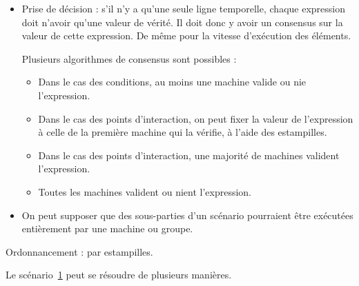 \documentclass{article}
\begin{document}
\begin{itemize}
	\item Prise de décision : s'il n'y a qu'une seule ligne temporelle, chaque expression doit n'avoir qu'une valeur de vérité. Il doit donc y avoir un consensus sur la valeur de cette expression. De même pour la vitesse d'exécution des éléments.
    
    Plusieurs algorithmes de consensus sont possibles : 
    \begin{itemize}
        \item Dans le cas des conditions, au moins une machine valide ou nie l'expression. 
        \item Dans le cas des points d'interaction, on peut fixer la valeur de l'expression à celle de la première machine qui la vérifie, à l'aide des estampilles. %
        \item Dans le cas des points d'interaction, une majorité de machines valident l'expression.
        \item Toutes les machines valident ou nient l'expression.
    \end{itemize}

	\item On peut supposer que des sous-parties d'un scénario pourraient être exécutées entièrement par une machine ou groupe.
\end{itemize}
Ordonnancement : par estampilles.

\begin{figure}[h]
    \centering
    \begin{tikzpicture}
    
    \end{tikzpicture}
    \label{scenar.trigger-1}
\end{figure}

Le scénario~\ref{scenar.trigger-1} peut se résoudre de plusieurs manières.
\end{document}
